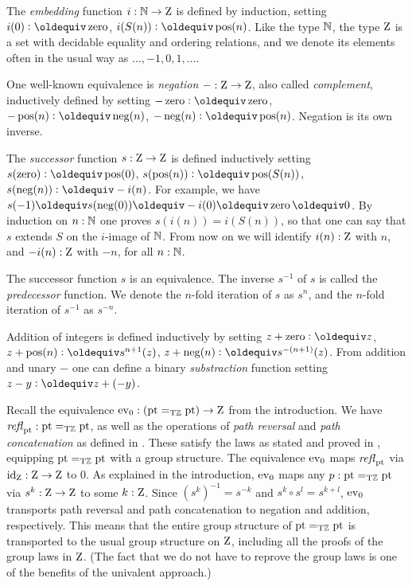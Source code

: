 \documentclass[a4,12pt]{amsart}
\begin{document}
The \emph{embedding} function $i:\mathbb{N}\to\mathrm{Z}$ is defined by induction,
setting $i(0)\defeq \zzero$, $i(S(n))\defeq \zpos(n)$.
Like the type $\mathbb{N}$, the type $\mathrm{Z}$ is a set with decidable equality
and ordering relations,
and we denote its elements often in the usual way as $\ldots,-1,0,1,\ldots$.

One well-known equivalence is \emph{negation} ${-}:\mathrm{Z}\to\mathrm{Z}$, 
also called \emph{complement}, inductively defined by setting 
$-\zzero\defeq \zzero$, 
$-\zpos(n)\defeq \zneg(n)$, 
$-\zneg(n)\defeq \zpos(n)$.
Negation is its own inverse.

The \emph{successor} function $s:\mathrm{Z}\to\mathrm{Z}$ is defined inductively setting 
$s(\zzero)\defeq \zpos(0)$, 
$s(\zpos(n))\defeq \zpos(S(n))$,
$s(\zneg(n))\defeq -i(n)$. For example, we have
$s(-1)\jdeq s(\zneg(0))\jdeq -i(0) \jdeq \zzero \jdeq 0$.
By induction on $n:\mathbb{N}$ one proves $s(i(n))=i(S(n))$, 
so that one can say that $s$ extends $S$ on the $i$-image of $\mathbb{N}$. 
From now on we will identify $i(n):\mathrm{Z}$ with $n$,
and $-i(n):\mathrm{Z}$ with $-n$, for all $n:\mathbb{N}$.

The successor function $s$ is an equivalence.
The inverse $s^{-1}$ of $s$ is called the \emph{predecessor} function.
We denote the $n$-fold iteration of $s$ as $s^n$, and
the $n$-fold iteration of $s^{-1}$ as $s^{-n}$.

Addition of integers is defined inductively by setting
$z + \zzero\defeq z$, 
$z + \zpos(n)\defeq s^{n+1}(z)$, 
$z + \zneg(n)\defeq s^{-(n+1)}(z)$.
From addition and unary $-$ one can define a binary
\emph{substraction} function setting $z-y \defeq z+(-y)$.


Recall the equivalence $\mathrm{ev}_0 : ({\mathord{\mathrm{pt}}}=_{\mathrm{T}\mathbb{Z}} {\mathord{\mathrm{pt}}})\to\mathrm{Z}$ from the introduction.
We have $\mathop{{\it refl}_{{\mathord{\mathrm{pt}}}}} : {\mathord{\mathrm{pt}}}=_{\mathrm{T}\mathbb{Z}} {\mathord{\mathrm{pt}}}$, as well as the operations
of \emph{path reversal} and \emph{path concatenation} as defined
in \cite[Ch. 2.1]{hottbook}. These satisfy the laws as stated
and proved in \cite[Lemma 2.1.4]{hottbook}, equipping ${\mathord{\mathrm{pt}}}=_{\mathrm{T}\mathbb{Z}} {\mathord{\mathrm{pt}}}$
with a group structure.
The equivalence $\mathrm{ev}_0$ maps $\mathop{{\it refl}_{{\mathord{\mathrm{pt}}}}}$ via $\mathord{\mathrm{id}}_{\mathrm{Z}} : \mathrm{Z}\to\mathrm{Z}$ to $0$.
As explained in the introduction, $\mathrm{ev}_0$ maps any $p : {\mathord{\mathrm{pt}}}=_{\mathrm{T}\mathbb{Z}} {\mathord{\mathrm{pt}}}$
via $s^k : \mathrm{Z}\to\mathrm{Z}$ to some $k:\mathrm{Z}$. Since $(s^k)^{-1} = s^{-k}$
and $s^k \circ s^l = s^{k+l}$, $\mathrm{ev}_0$ transports path reversal 
and path concatenation to negation and addition, respectively.
This means that the entire group structure of ${\mathord{\mathrm{pt}}}=_{\mathrm{T}\mathbb{Z}} {\mathord{\mathrm{pt}}}$
is transported to the usual group structure on $\mathrm{Z}$,
including all the proofs of the group laws in $\mathrm{Z}$.
(The fact that we do not have to reprove the group laws
is one of the benefits of the univalent approach.)
\end{document}
